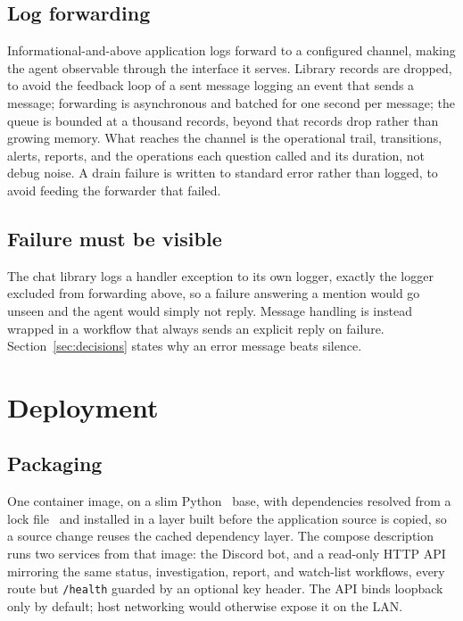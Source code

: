 \documentclass[11pt,a4paper]{article}
\let\stdsection\section
\renewcommand{\section}{\clearpage\stdsection}
\begin{document}
\subsection{Log forwarding}

Informational-and-above application logs forward to a configured channel, making the
agent observable through the interface it serves. Library records are dropped, to
avoid the feedback loop of a sent message logging an event that sends a message;
forwarding is asynchronous and batched for one second per message; the queue is
bounded at a thousand records, beyond that records drop rather than growing memory.
What reaches the channel is the operational trail, transitions, alerts, reports, and
the operations each question called and its duration, not debug noise. A drain failure is written to
standard error rather than logged, to avoid feeding the forwarder that failed.

\subsection{Failure must be visible}
\label{sec:silent}

The chat library logs a handler exception to its own logger, exactly the logger
excluded from forwarding above, so a failure answering a mention would go unseen and
the agent would simply not reply. Message handling is instead wrapped in a workflow
that always sends an explicit reply on failure. Section~\ref{sec:decisions} states why
an error message beats silence.

\section{Deployment}

\subsection{Packaging}

One container image, on a slim Python~\cite{python} base, with dependencies resolved
from a lock file~\cite{uv} and installed in a layer built before the application
source is copied, so a source change reuses the cached dependency layer. The compose
description~\cite{compose} runs two services from that image: the Discord bot, and a
read-only HTTP API mirroring the same status, investigation, report, and watch-list
workflows, every route but \texttt{/health} guarded by an optional key header. The
API binds loopback only by default; host networking would otherwise expose it on the
LAN.
\end{document}
